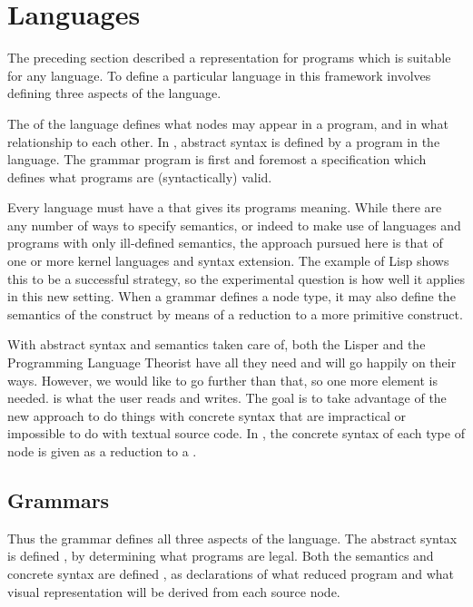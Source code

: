 \chapter{Languages}
\label{languages}
The preceding section described a representation for programs which is suitable for any language. To define a particular language in this framework involves defining three aspects of the language.

The  of the language defines what nodes may appear in a program, and in what relationship to each other. In \Meta, abstract syntax is defined by a program in the  language. The grammar program is first and foremost a specification which defines what programs are (syntactically) valid. 

Every language must have a  that gives its programs meaning. While there are any number of ways to specify semantics, or indeed to make use of languages and programs with only ill-defined semantics, the approach pursued here is that of one or more kernel languages and syntax extension. The example of Lisp shows this to be a successful strategy, so the experimental question is how well it applies in this new setting. When a grammar defines a node type, it may also define the semantics of the construct by means of a reduction to a more primitive construct.

With abstract syntax and semantics taken care of, both the Lisper and the Programming Language Theorist have all they need and will go happily on their ways. However, we would like to go further than that, so one more element is needed.  is what the user reads and writes. The goal is to take advantage of the new approach to do things with concrete syntax that are impractical or impossible to do with textual source code. In \Meta, the concrete syntax of each type of node is given as a reduction to a .

%
%
\section{Grammars}
\label{grammars}
Thus the grammar defines all three aspects of the language. The abstract syntax is defined , by determining what programs are legal. Both the semantics and concrete syntax are defined , as declarations of what reduced program and what visual representation will be derived from each source node.

